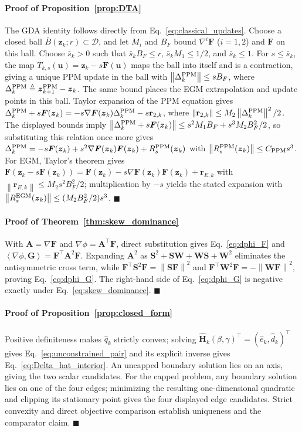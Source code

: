\documentclass[journal]{IEEEtran}
\theoremstyle{remark}
\newcommand{\inner}[2]{\left\langle #1,#2\right\rangle}
\newcommand{\norm}[1]{\left\lVert #1\right\rVert}
\newcommand{\cD}{\mathcal{D}}
\newcommand{\bz}{\boldsymbol{z}}
\newcommand{\bu}{\boldsymbol{u}}
\newcommand{\bH}{\boldsymbol{H}}
\newcommand{\bW}{\boldsymbol{W}}
\newcommand{\bS}{\boldsymbol{S}}
\newcommand{\bA}{\boldsymbol{A}}
\newcommand{\bF}{\boldsymbol{F}}
\newcommand{\bG}{\boldsymbol{G}}
\begin{document}
\paragraph{Proof of Proposition~\ref{prop:DTA}}\label{app:DTA}
	The GDA identity follows directly from Eq.~\eqref{eq:classical_updates}.
	Choose a closed ball $\bar B(\bz_k;r)\subset\cD$, and let $M_i$ and $B_F$ bound $\nabla^i\bF$ ($i=1,2$) and $\bF$ on this ball.
	Choose $\bar s_k>0$ such that $\bar s_k B_F\le r$, $\bar s_k M_1\le1/2$, and $\bar s_k\le1$.
	For $s\le\bar s_k$, the map $T_{k,s}(\bu)=\bz_k-s\bF(\bu)$ maps the ball into itself and is a contraction, giving a unique PPM update in the ball with $\norm{\Delta_k^{\rm PPM}}\le sB_F$, where $\Delta_k^{\rm PPM}\triangleq\bz_{k+1}^{\rm PPM}-\bz_k$.
	The same bound places the EGM extrapolation and update points in this ball.
	Taylor expansion of the PPM equation gives $\Delta_k^{\rm PPM}+s\bF(\bz_k)=-s\nabla\bF(\bz_k)\Delta_k^{\rm PPM}-s\mathbf r_{2,k}$, where $\norm{\mathbf r_{2,k}}\le M_2\norm{\Delta_k^{\rm PPM}}^2/2$.
	The displayed bounds imply $\norm{\Delta_k^{\rm PPM}+s\bF(\bz_k)}\le s^2M_1B_F+s^3M_2B_F^2/2$, so substituting this relation once more gives $\Delta_k^{\rm PPM}=-s\bF(\bz_k)+s^2\nabla\bF(\bz_k)\bF(\bz_k)+R_s^{\rm PPM}(\bz_k)$ with $\norm{R_s^{\rm PPM}(\bz_k)}\le C_{\rm PPM}s^3$.
	For EGM, Taylor's theorem gives $\bF(\bz_k-s\bF(\bz_k))=\bF(\bz_k)-s\nabla\bF(\bz_k)\bF(\bz_k)+\mathbf r_{E,k}$ with $\norm{\mathbf r_{E,k}}\le M_2s^2B_F^2/2$; multiplication by $-s$ yields the stated expansion with $\norm{R_s^{\rm EGM}(\bz_k)}\le(M_2B_F^2/2)s^3$.
	\hfill$\blacksquare$
	
	\paragraph{Proof of Theorem~\ref{thm:skew_dominance}}\label{app:skew_dominance}
	With $\bA=\nabla\bF$ and $\nabla\phi=\bA^\top\bF$, direct substitution gives Eq.~\eqref{eq:dphi_F} and $\inner{\nabla\phi}{\bG}=\bF^\top\bA^2\bF$.
	Expanding $\bA^2$ as $\bS^2+\bS\bW+\bW\bS+\bW^2$ eliminates the antisymmetric cross term, while $\bF^\top\bS^2\bF=\norm{\bS\bF}^2$ and $\bF^\top\bW^2\bF=-\norm{\bW\bF}^2$, proving Eq.~\eqref{eq:dphi_G}.
	The right-hand side of Eq.~\eqref{eq:dphi_G} is negative exactly under Eq.~\eqref{eq:skew_dominance}.
	\hfill$\blacksquare$
	
	\paragraph{Proof of Proposition~\ref{prop:closed_form}}\label{app:closed_form}
	Positive definiteness makes $\hat q_k$ strictly convex; solving $\widehat{\bH}_k(\beta,\gamma)^\top=(\hat e_k,\hat d_k)^\top$ gives Eq.~\eqref{eq:unconstrained_pair} and its explicit inverse gives Eq.~\eqref{eq:Delta_hat_interior}.
	An uncapped boundary solution lies on an axis, giving the two scalar candidates.
	For the capped problem, any boundary solution lies on one of the four edges; minimizing the resulting one-dimensional quadratic and clipping its stationary point gives the four displayed edge candidates.
	Strict convexity and direct objective comparison establish uniqueness and the comparator claim.
	\hfill$\blacksquare$
	
\end{document}
